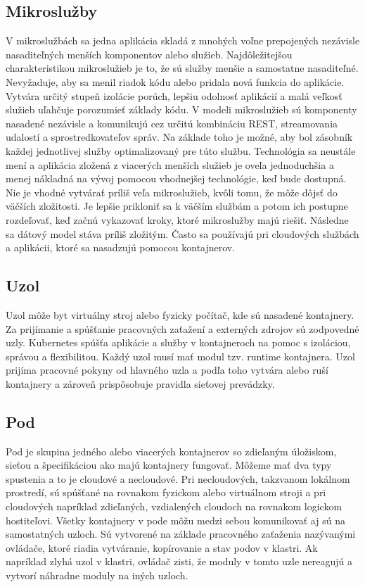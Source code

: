 \subsection*{Mikroslužby}
V mikroslužbách sa jedna aplikácia skladá z mnohých voľne prepojených nezávisle nasaditeľných menších komponentov alebo služieb. Najdôležitejšou charakteristikou mikroslužieb je to, že sú služby menšie a samostatne nasaditeľné. Nevyžaduje, aby sa menil riadok kódu alebo pridala nová funkcia do aplikácie. Vytvára určitý stupeň izolácie porúch, lepšiu odolnosť aplikácií a malá veľkosť služieb uľahčuje porozumieť základy kódu. V modeli mikroslužieb sú komponenty nasadené nezávisle a komunikujú cez určitú kombináciu REST, streamovania udalostí a sprostredkovateľov správ. Na základe toho je možné, aby bol zásobník každej jednotlivej služby optimalizovaný pre túto službu. Technológia sa neustále mení a aplikácia zložená z viacerých menších služieb je oveľa jednoduchšia a menej nákladná na vývoj pomocou vhodnejšej technológie, keď bude dostupná.\cite{microibm} Nie je vhodné vytvárať príliš veľa mikroslužieb, kvôli tomu, že môže dôjsť do väčších zložitosti. Je lepšie prikloniť sa k väčším službám a potom ich postupne rozdeľovať, keď začnú vykazovať kroky, ktoré mikroslužby majú riešiť. Následne sa dátový model stáva príliš zložitým. Často sa používajú pri cloudových službách a aplikácii, ktoré sa nasadzujú pomocou kontajnerov.

\subsection*{Uzol}
Uzol môže byt virtuálny stroj alebo fyzicky počítač, kde sú nasadené kontajnery. Za prijímanie a spúšťanie pracovných zaťažení a externých zdrojov sú zodpovedné uzly. Kubernetes spúšťa aplikácie a služby v kontajneroch na pomoc s izoláciou, správou a flexibilitou. Každý uzol musí mať modul tzv. runtime kontajnera. Uzol prijíma pracovné pokyny od hlavného uzla a podľa toho vytvára alebo ruší kontajnery a zároveň prispôsobuje pravidla sieťovej prevádzky.

\subsection*{Pod}
Pod je skupina jedného alebo viacerých kontajnerov so zdieľaným úložiskom, sieťou a špecifikáciou ako majú kontajnery fungovať. Môžeme mať dva typy spustenia a to je cloudové a necloudové. Pri necloudových, takzvanom lokálnom prostredí, sú spúšťané na rovnakom fyzickom alebo virtuálnom stroji a pri cloudových napríklad zdieľaných, vzdialených cloudoch na rovnakom logickom hostiteľovi. Všetky kontajnery v pode môžu medzi sebou komunikovať aj sú na samostatných uzloch. Sú vytvorené na základe pracovného zaťaženia nazývanými ovládače, ktoré riadia vytváranie, kopírovanie a stav podov v klastri. Ak napríklad zlyhá uzol v klastri, ovládač zisti, že moduly v tomto uzle nereagujú a vytvorí náhradne moduly na iných uzloch.

